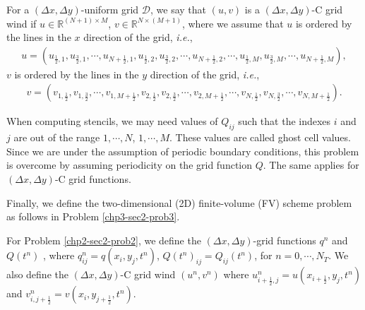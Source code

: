 \begin{definition}
	\label{chp2-rmk-2d-gridfunction2}
	For a $(\Delta x,\Delta y)$-uniform grid $\mathcal{D}$, we say that $(u,v)$ is a $(\Delta x,\Delta y)$-C grid wind if 
	$u \in \mathbb{R}^{(N+1) \times M}$, $v \in \mathbb{R}^{N \times (M+1)}$, where we assume that $u$ is ordered by
	the lines in the $x$ direction of the grid, \textit{i.e.},
	\begin{align*}
	u = (u_{\frac{1}{2},1}, u_{\frac{3}{2},1}, \cdots, u_{N+\frac{1}{2},1}, u_{\frac{1}{2},2}, u_{\frac{3}{2},2}, \cdots, u_{N+\frac{1}{2},2}, \cdots ,
	u_{\frac{1}{2},M}, u_{\frac{3}{2},M}, \cdots, u_{N+\frac{1}{2},M}),
	\end{align*}
	$v$ is ordered by the lines in the $y$ direction of the grid, \textit{i.e.},
	\begin{align*}
	v = (v_{1,\frac{1}{2}}, v_{1,\frac{3}{2}}, \cdots, v_{1,M+\frac{1}{2}}, v_{2,\frac{1}{2}}, v_{2,\frac{3}{2}}, \cdots, v_{2,M+\frac{1}{2}}, \cdots ,
	v_{N,\frac{1}{2}}, v_{N,\frac{3}{2}}, \cdots, v_{N,M+\frac{1}{2}}).
\end{align*}
\end{definition}
\begin{remark}
	When computing stencils, we may need values of $Q_{ij}$ such that the
	indexes $i$ and $j$ are out of the range $1,\cdots, N$, $1,\cdots, M$.
	These values are called ghost cell values.
	Since we are under the assumption of periodic boundary conditions, this problem
	is overcome by assuming periodicity on the grid function $Q$. 
	The same applies for $(\Delta x,\Delta y)$-C grid functions.
\end{remark}
Finally, we define the two-dimensional (2D) finite-volume (FV)
scheme problem as follows in Problem \ref{chp3-sec2-prob3}.
\begin{remark}
	For Problem \ref{chp2-sec2-prob2}, we define the $(\Delta x,\Delta y)$-grid functions
	$q^n$ and $Q(t^n)$ , where ${q}^n_{ij} = {q}(x_i, y_j, t^{n})$, $Q(t^n)_{ij} = Q_{ij}(t^n)$, for $n=0, \cdots, N_T$.
	We also define the $(\Delta x,\Delta y)$-C grid wind $(u^n,v^n)$ where $u_{i+\frac{1}{2},j}^n = u(x_{i+\frac{1}{2}},y_j,t^{n})$ and
	$v_{i,j+\frac{1}{2}}^n = v(x_i,y_{j+\frac{1}{2}},t^{n})$.
\end{remark}
